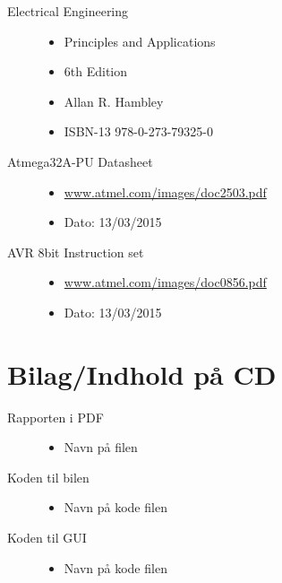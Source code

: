 \begin{description}
	\item[Electrical Engineering] \hfill
		\begin{itemize}
			\item Principles and Applications
			\item 6th Edition
			\item Allan R. Hambley
			\item ISBN-13 978-0-273-79325-0
		\end{itemize}
	\item[Atmega32A-PU Datasheet] \hfill
		\begin{itemize}
			\item \url{www.atmel.com/images/doc2503.pdf}
			\item Dato: 13/03/2015
		\end{itemize}
	\item[AVR 8bit Instruction set] \hfill
		\begin{itemize}
			\item \url{www.atmel.com/images/doc0856.pdf}
			\item Dato: 13/03/2015
		\end{itemize}
\end{description}

\section{Bilag/Indhold på CD}

\begin{description}
	\item[Rapporten i PDF] \hfill
		\begin{itemize}
			\item Navn på filen
		\end{itemize}
	\item[Koden til bilen] \hfill
		\begin{itemize}
			\item Navn på kode filen
		\end{itemize}
	\item[Koden til GUI] \hfill
		\begin{itemize}
			\item Navn på kode filen
		\end{itemize}
\end{description}